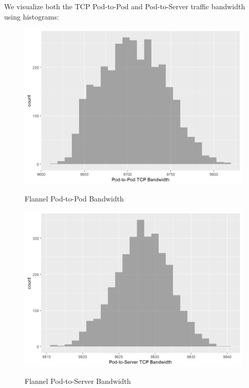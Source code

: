 We visualize both the TCP Pod-to-Pod and Pod-to-Server traffic bandwidth using histograms:

\begin{Shaded}
\begin{Highlighting}[]
\NormalTok{(}\SpecialCharTok{\textasciitilde{}} 
\end{Highlighting}
\end{Shaded}

\begin{figure}[H]
\centering
\caption {Flannel Pod-to-Pod Bandwidth}
\includegraphics[width=\linewidth]{images/unnamed-chunk-8-1.png}
\label{fig:flannel-8-1}
\end{figure}

\begin{Shaded}
\begin{Highlighting}[]
\NormalTok{(}\SpecialCharTok{\textasciitilde{}} 
\end{Highlighting}
\end{Shaded}

\begin{figure}[H]
\centering
\caption {Flannel Pod-to-Server Bandwidth}
\includegraphics[width=\linewidth]{images/unnamed-chunk-9-1.png}
\label{fig:flannel-9-1}
\end{figure}

